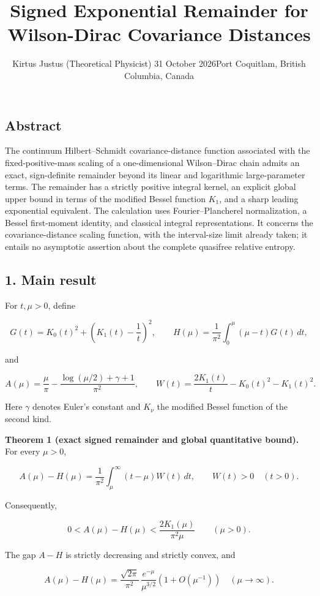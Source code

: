 \documentclass[
  10pt,
  a4paper,
]{article}
\title{Signed Exponential Remainder for Wilson-Dirac Covariance Distances}
\author{Kirtus Justus (Theoretical Physicist) \textbullet{} 31 October 2026\tabularnewline Port Coquitlam, British Columbia, Canada}
\date{}
\begin{document}
\maketitle

\subsection{Abstract}\label{abstract}

The continuum Hilbert--Schmidt covariance-distance function associated with the fixed-positive-mass scaling of a one-dimensional Wilson--Dirac chain admits an exact, sign-definite remainder beyond its linear and logarithmic large-parameter terms. The remainder has a strictly positive integral kernel, an explicit global upper bound in terms of the modified Bessel function \(K_1\), and a sharp leading exponential equivalent. The calculation uses Fourier--Plancherel normalization, a Bessel first-moment identity, and classical integral representations. It concerns the covariance-distance scaling function, with the interval-size limit already taken; it entails no asymptotic assertion about the complete quasifree relative entropy.

\subsection{1. Main result}\label{main-result}

For \(t,\mu>0\), define

\[
G(t)=K_0(t)^2+\left(K_1(t)-\frac1t\right)^2,
\qquad H(\mu)=\frac1{\pi^2}\int_0^\mu(\mu-t)G(t)\,dt,
\]

and

\[
A(\mu)=\frac\mu\pi-\frac{\log(\mu/2)+\gamma+1}{\pi^2},
\qquad
W(t)=\frac{2K_1(t)}t-K_0(t)^2-K_1(t)^2.
\]

Here \(\gamma\) denotes Euler's constant and \(K_\nu\) the modified Bessel function of the second kind.

\textbf{Theorem 1 (exact signed remainder and global quantitative bound).} For every \(\mu>0\),

\[
\boxed{
A(\mu)-H(\mu)=\frac1{\pi^2}\int_\mu^\infty(t-\mu)W(t)\,dt,
\qquad W(t)>0\quad(t>0).
}
\tag{1}
\]

Consequently,

\[
\boxed{0<A(\mu)-H(\mu)<\frac{2K_1(\mu)}{\pi^2\mu}\qquad(\mu>0).}
\tag{2}
\]

The gap \(A-H\) is strictly decreasing and strictly convex, and

\[
\boxed{
A(\mu)-H(\mu)
=\frac{\sqrt{2\pi}}{\pi^2}\,
\frac{e^{-\mu}}{\mu^{3/2}}\left(1+O(\mu^{-1})\right)
\quad(\mu\to\infty).
}
\tag{3}
\]
\end{document}
